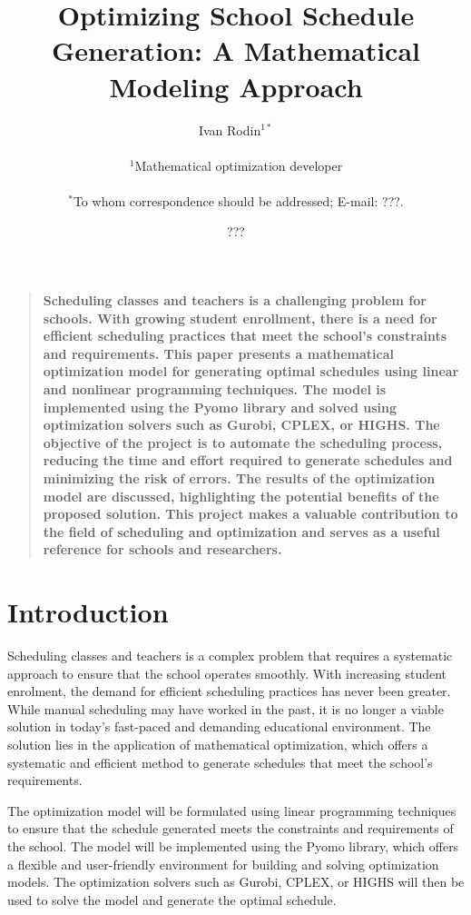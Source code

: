 \documentclass{article}
\title{Optimizing School Schedule Generation: A Mathematical Modeling Approach}
\author
{Ivan Rodin$^{1\ast}$\\
\\
\normalsize{$^{1}$Mathematical optimization developer}\\
\\
\normalsize{$^\ast$To whom correspondence should be addressed; E-mail:  ???.}
}
\date{???}
\newenvironment{sciabstract}{%
\begin{quote} \bf}
{\end{quote}}
\begin{document}
 

\baselineskip24pt

\maketitle 


\begin{sciabstract}
  Scheduling classes and teachers is a challenging problem for schools. With growing student enrollment, there is a need for efficient scheduling practices that meet the school's constraints and requirements. This paper presents a mathematical optimization model for generating optimal schedules using linear and nonlinear programming techniques. The model is implemented using the Pyomo library and solved using optimization solvers such as Gurobi, CPLEX, or HIGHS. The objective of the project is to automate the scheduling process, reducing the time and effort required to generate schedules and minimizing the risk of errors. The results of the optimization model are discussed, highlighting the potential benefits of the proposed solution. This project makes a valuable contribution to the field of scheduling and optimization and serves as a useful reference for schools and researchers.
\end{sciabstract}


\section*{Introduction}

Scheduling classes and teachers is a complex problem that requires a systematic approach to ensure that the school operates smoothly. With increasing student enrolment, the demand for efficient scheduling practices has never been greater. While manual scheduling may have worked in the past, it is no longer a viable solution in today's fast-paced and demanding educational environment. The solution lies in the application of mathematical optimization, which offers a systematic and efficient method to generate schedules that meet the school's requirements.

The optimization model will be formulated using linear programming techniques to ensure that the schedule generated meets the constraints and requirements of the school. The model will be implemented using the Pyomo library, which offers a flexible and user-friendly environment for building and solving optimization models. The optimization solvers such as Gurobi, CPLEX, or HIGHS will then be used to solve the model and generate the optimal schedule.
\end{document}
